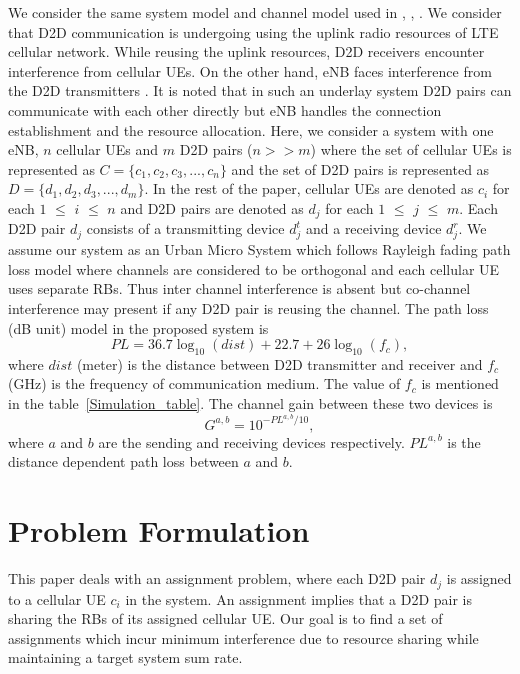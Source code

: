 \documentclass{ieeeaccess}
\begin{document}
We consider the same system model and channel model used in \cite{islam2016radio}, \cite{islam2015reducing}, \cite{islam2015reducing_old}. We consider that D2D communication is undergoing using the uplink radio resources of LTE cellular network. While reusing the uplink resources, D2D receivers encounter interference from cellular UEs. On the other hand, eNB faces interference from the D2D transmitters \cite{islam2016radio}. It is noted that in such an underlay system D2D pairs can communicate with each other directly but eNB \cite{zulhasnine} handles the connection establishment and the resource allocation. Here, we consider a system with one eNB, $n$ cellular UEs and $m$ D2D pairs ($n>>m$) where the set of cellular UEs is represented as $C = \{c_{1}, c_{2}, c_{3}, ..., c_{n}\} $ and the set of D2D pairs is represented as $D = \{ d_{1}, d_{2}, d_{3}, ..., d_{m} \}$. In the rest of the paper, cellular UEs are denoted as $c_i$ for each $1$ $\leq$ $i$ $\leq$ $n$ and D2D pairs are denoted as $d_j$ for each $1$ $\leq$ $j$ $\leq$ $m$. Each D2D pair $d_j$ consists of a transmitting device $d_j^t$ and a receiving device $d_j^r$. We assume our system as an Urban Micro System which follows Rayleigh fading path loss model \cite{islam2016radio,zulhasnine} where channels are considered to be orthogonal and each cellular UE uses separate RBs. Thus inter channel interference is absent but co-channel interference may present if any D2D pair is reusing the channel. The path loss (dB unit) model in the proposed system is \cite{zulhasnine} 
\begin{equation}
PL = 36.7\log_{10}(dist)+22.7+26\log_{10}(f_{c}),
\end{equation}
where $dist$ (meter) is the distance between D2D transmitter and receiver and $f_{c}$ (GHz) is the frequency of communication medium. The value of  $f_{c}$ is mentioned in the table~\ref{Simulation_table}.
The channel gain between these two devices is \cite{zulhasnine} 
\begin{equation}
G^{a,b} = 10^{-PL^{a,b}/10},
\end{equation}
where $a$ and $b$ are the sending and receiving devices respectively. $PL^{a,b}$ is the distance dependent path loss between $a$ and $b$. 

\section{Problem Formulation}\label{sec:problemFormulation}
\smallskip
  
This paper deals with an assignment problem, where each D2D pair $d_j$ is assigned to a cellular UE $c_i$ in the system. An assignment implies that a D2D pair is sharing the RBs of its assigned cellular UE. Our goal is to find a set of assignments which incur minimum interference due to resource sharing while maintaining a target system sum rate.
  
\end{document}

